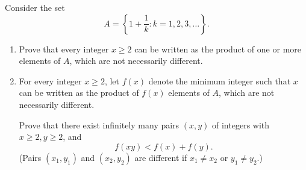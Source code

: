 Consider the set \[A=\left\{1+\frac{1}{k}:k=1,2,3,\ldots\right\}.\]

\begin{enumerate}[label=(\alph*)]
	
	\item Prove that every integer $x\geq2$ can be written as the product of one or more elements of $A$, which are not necessarily different.
	
	\item For every integer $x\geq2$, let $f\left(x\right)$ denote the minimum integer such that $x$ can be written as the product of $f\left(x\right)$ elements of $A$, which are not necessarily different.
	
	Prove that there exist infinitely many pairs $\left(x,y\right)$ of integers with $x\geq2,y\geq2$, and \[f\left(xy\right)<f\left(x\right)+f\left(y\right).\] (Pairs $\left(x_1,y_1\right)$ and $\left(x_2,y_2\right)$ are different if $x_1\neq x_2$ or $y_1\neq y_2$.)
	
\end{enumerate}